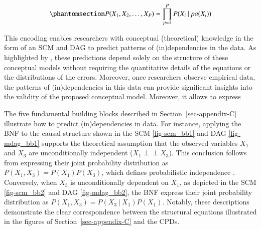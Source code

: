 \documentclass[
  authoryear,
  review,
  1p]{elsarticle}
\begin{document}
\begin{equation}\phantomsection\label{eq-net_factor}{
P(X_{1}, X_{2}, \dots, X_{P}) = \prod^{P}_{p=1} P(X_{i} \: | \: pa(X_{i}) )
}\end{equation}

This encoding enables researchers with conceptual (theoretical)
knowledge in the form of an SCM and DAG to predict patterns of
(in)dependencies in the data. As highlighted by
\citet[pp.~35]{Pearl_et_al_2016}, these predictions depend solely on the
structure of these conceptual models without requiring the quantitative
details of the equations or the distributions of the errors. Moreover,
once researchers observe empirical data, the patterns of
(in)dependencies in this data can provide significant insights into the
validity of the proposed conceptual model. Moreover, it allows to
express

The five fundamental building blocks described in
Section~\ref{sec-appendix-C} illustrate how to predict (in)dependencies
in data. For instance, applying the BNF to the causal structure shown in
the SCM \ref{fig-scm_bb1} and DAG \ref{fig-mdag_bb1} supports the
theoretical assumption that the observed variables \(X_{1}\) and
\(X_{3}\) are unconditionally independent
(\(X_{1} \perp\!\!\!\perp X_{3}\)). This conclusion follows from
expressing their joint probability distribution as
\(P(X_{1}, X_{3}) = P(X_{1}) P(X_{3})\), which defines probabilistic
independence \citep[pp.~24]{Neal_2020}. Conversely, when \(X_{3}\) is
unconditionally dependent on \(X_{1}\), as depicted in the SCM
\ref{fig-scm_bb2} and DAG \ref{fig-mdag_bb2}, the BNF express their
joint probability distribution as
\(P(X_{1}, X_{3}) = P(X_{3} \: | \: X_{1}) P(X_{1})\). Notably, these
descriptions demonstrate the clear correspondence between the structural
equations illustrated in the figures of Section~\ref{sec-appendix-C} and
the CPDs.
\end{document}
